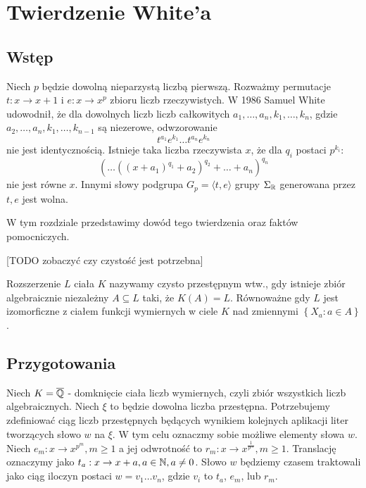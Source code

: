 \chapter{Twierdzenie White'a}
\label{ch:white_theorem}
\section{Wstęp}

Niech $p$ będzie dowolną nieparzystą liczbą pierwszą. Rozważmy permutacje $t :
x \rightarrow  x+1$ i $e: x \rightarrow x^p$ zbioru liczb rzeczywistych. W 1986
Samuel White \cite{whi88} udowodnił, że dla dowolnych liczb liczb całkowitych
$a_1, \ldots, a_n, k_1, \ldots, k_n$, gdzie $a_2, \ldots, a_n, k_1, \ldots,
k_{n-1}$ są niezerowe, odwzorowanie
\begin{equation*}
  t^{a_1}e^{k_1}\ldots t^{a_n}e^{k_n}
\end{equation*}
nie jest identycznością. Istnieje taka liczba rzeczywista $x$, że dla $q_i$
postaci $p^{k_i}$:
\begin{equation}
  \left( \ldots \left(\left(x + a_1\right)^{q_1} + a_2\right)^{q_2} +
    \ldots + a_n\right)^{q_n}
\label{eq:gp_element}
\end{equation}
nie jest równe $x$. Innymi słowy podgrupa $G_p = \langle t, e \rangle$ grupy
$\Sigma_{\mathbb{R}}$ generowana przez $t, e$ jest wolna.

W tym rozdziale przedstawimy dowód tego twierdzenia oraz faktów pomocniczych.

[TODO zobaczyć czy czystość jest potrzebna]
\begin{defin}
  Rozszerzenie $L$ ciała $K$ nazywamy czysto przestępnym wtw., gdy istnieje
  zbiór algebraicznie niezależny $A \subseteq L$ taki, że $K(A) = L$. Równoważne
  gdy $L$ jest izomorficzne z ciałem funkcji wymiernych w ciele $K$ nad
  zmiennymi $\left\{X_a : a \in A\right\}$.
\end{defin}

\section{Przygotowania}
\label{sec:preparation}
Niech $K = \overline{\mathbb{Q}}$ - domknięcie ciała liczb wymiernych, czyli zbiór
wszystkich liczb algebraicznych.
Niech $\xi$ to będzie dowolna liczba przestępna.
Potrzebujemy zdefiniować ciąg liczb przestępnych będących wynikiem kolejnych
aplikacji liter tworzących słowo $w$ na $\xi$.
W tym celu oznaczmy sobie możliwe elementy słowa $w$.
Niech $e_m: x \rightarrow x^{p^m}, m \geq 1$ a jej odwrotność to $r_m: x
\rightarrow x^{\frac{1}{p^m}}, m \geq 1$.
Translację oznaczymy jako $t_a: x \rightarrow x + a, a \in \mathbb{N}, a \neq 0$.
Słowo $w$ będziemy czasem traktowali jako ciąg iloczyn postaci $w =
v_1\ldots v_n$, gdzie $v_i$ to $t_a$, $e_m$, lub $r_m$.

